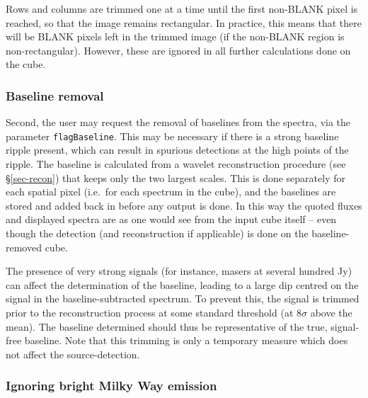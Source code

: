 \documentclass[12pt,a4paper]{article}
\newcommand{\ie}{i.e.\ }
\begin{document}
Rows and columns are trimmed one at a time until the first non-BLANK
pixel is reached, so that the image remains rectangular. In practice,
this means that there will be BLANK pixels left in the trimmed image
(if the non-BLANK region is non-rectangular). However, these are
ignored in all further calculations done on the cube.

\subsubsection{Baseline removal}

Second, the user may request the removal of baselines from the
spectra, via the parameter \texttt{flagBaseline}. This may be necessary
if there is a strong baseline ripple present, which can result in
spurious detections at the high points of the ripple. The baseline is
calculated from a wavelet reconstruction procedure (see
\S\ref{sec-recon}) that keeps only the two largest scales. This is
done separately for each spatial pixel (\ie for each spectrum in the
cube), and the baselines are stored and added back in before any
output is done. In this way the quoted fluxes and displayed spectra
are as one would see from the input cube itself -- even though the
detection (and reconstruction if applicable) is done on the
baseline-removed cube.

The presence of very strong signals (for instance, masers at several
hundred Jy) can affect the determination of the baseline, leading to a
large dip centred on the signal in the baseline-subtracted
spectrum. To prevent this, the signal is trimmed prior to the
reconstruction process at some standard threshold (at $8\sigma$ above
the mean). The baseline determined should thus be representative of
the true, signal-free baseline. Note that this trimming is only a
temporary measure which does not affect the source-detection.

\subsubsection{Ignoring bright Milky Way emission}
\end{document}
